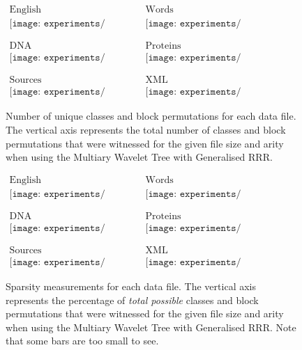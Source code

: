 \begin{figure}[h]
\begin{center}
$\begin{array}{cc}
\mbox{English} & \mbox{Words} \\
\texttt{[image: experiments/unique\_english]} &
\texttt{[image: experiments/unique\_english\_ints]} \\ \\ \\
\mbox{DNA} & \mbox{Proteins} \\ 
\texttt{[image: experiments/unique\_dna]} &
\texttt{[image: experiments/unique\_proteins]} \\ \\ \\
\mbox{Sources} & \mbox{XML} \\
\texttt{[image: experiments/unique\_sources]} &
\texttt{[image: experiments/unique\_dblp\_xml]}
\end{array}$
\end{center}
\caption{Number of unique classes and block permutations for each data 
file. The vertical axis represents the total number of classes and block
permutations that were witnessed for the given file size and arity when using 
the Multiary Wavelet Tree with Generalised RRR.}
\label{fig:unique}
\end{figure}
	
\begin{figure}[h]
\begin{center}
$\begin{array}{cc}
\mbox{English} & \mbox{Words} \\
\texttt{[image: experiments/sparse\_english]} &
\texttt{[image: experiments/sparse\_english\_ints]} \\ \\ \\
\mbox{DNA} & \mbox{Proteins} \\ 
\texttt{[image: experiments/sparse\_dna]} &
\texttt{[image: experiments/sparse\_proteins]} \\ \\ \\
\mbox{Sources} & \mbox{XML} \\
\texttt{[image: experiments/sparse\_sources]} &
\texttt{[image: experiments/sparse\_dblp\_xml]}
\end{array}$
\end{center}
\caption{Sparsity measurements for each data file. The vertical axis represents
the percentage of \emph{total possible} classes and block permutations that were
witnessed for the given file size and arity when using the 
Multiary Wavelet Tree with Generalised RRR. Note that some bars are too small to 
see.}
\label{fig:sparse}
\end{figure}

